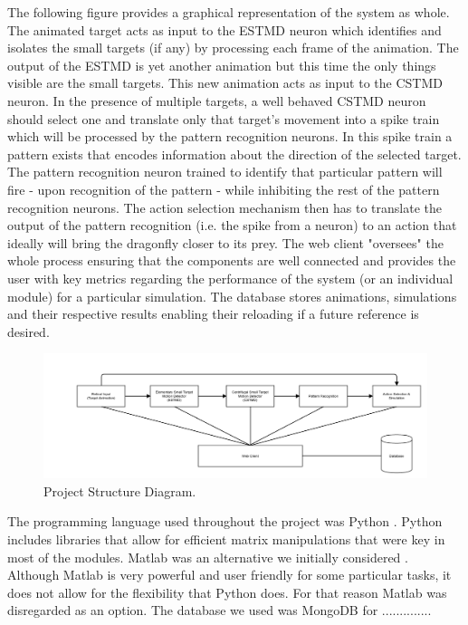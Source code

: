 \documentclass[a4paper,11pt]{article}
\begin{document}
The following figure provides a graphical representation of the system as whole. The animated target acts as input to the ESTMD neuron which identifies and isolates the small targets (if any) by processing each frame of the animation. The output of the ESTMD is yet another animation but this time the only things visible are the small targets. This new animation acts as input to the CSTMD neuron. In the presence of multiple targets, a well behaved CSTMD neuron should select one and translate only that target's movement into a spike train which will be processed by the pattern recognition neurons. In this spike train a pattern exists that encodes information about the direction of the selected target. The pattern recognition neuron trained to identify that particular pattern will fire - upon recognition of the pattern - while inhibiting the rest of the pattern recognition neurons. The action selection mechanism then has to translate the output of the pattern recognition (i.e. the spike from a neuron) to an action that ideally will bring the dragonfly closer to its prey.
The web client "oversees" the whole process ensuring that the components are well connected and provides the user with key metrics regarding the performance of the system (or an individual module) for a particular simulation. The database stores animations, simulations and their respective results enabling their reloading if a future reference is desired.

\begin{figure}[hb]
\centering
\includegraphics[scale = 0.3]{designblockdiagram}
\caption{Project Structure Diagram.}
\end{figure}


The programming language used throughout the project was Python \cite{python}. Python includes libraries that allow for efficient matrix manipulations that were key in most of the modules. Matlab was an alternative we initially considered \cite{matlab}. Although Matlab is very powerful and user friendly for some particular tasks, it does not allow for the flexibility that Python does. For that reason Matlab was disregarded as an option.
The database we used was MongoDB for ..............
\end{document}
